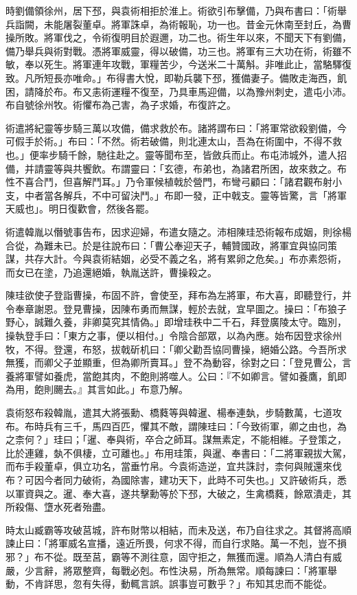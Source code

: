 \begin{pinyinscope}
時劉備領徐州，居下邳，與袁術相拒於淮上。術欲引布擊備，乃與布書曰：「術舉兵詣闕，未能屠裂董卓。將軍誅卓，為術報恥，功一也。昔金元休南至封丘，為曹操所敗。將軍伐之，令術復明目於遐邇，功二也。術生年以來，不聞天下有劉備，備乃舉兵與術對戰。憑將軍威靈，得以破備，功三也。將軍有三大功在術，術雖不敏，奉以死生。將軍連年攻戰，軍糧苦少，今送米二十萬斛。非唯此止，當駱驛復致。凡所短長亦唯命。」布得書大悅，即勒兵襲下邳，獲備妻子。備敗走海西，飢困，請降於布。布又恚術運糧不復至，乃具車馬迎備，以為豫州刺史，遣屯小沛。布自號徐州牧。術懼布為己害，為子求婚，布復許之。

術遣將紀靈等步騎三萬以攻備，備求救於布。諸將謂布曰：「將軍常欲殺劉備，今可假手於術。」布曰：「不然。術若破備，則北連太山，吾為在術圍中，不得不救也。」便率步騎千餘，馳往赴之。靈等聞布至，皆斂兵而止。布屯沛城外，遣人招備，并請靈等與共饗飲。布謂靈曰：「玄德，布弟也，為諸君所困，故來救之。布性不喜合鬥，但喜解鬥耳。」乃令軍候植戟於營門，布彎弓顧曰：「諸君觀布射小支，中者當各解兵，不中可留決鬥。」布即一發，正中戟支。靈等皆驚，言「將軍天威也」。明日復歡會，然後各罷。

術遣韓胤以僭號事告布，因求迎婦，布遣女隨之。沛相陳珪恐術報布成姻，則徐楊合從，為難未已。於是往說布曰：「曹公奉迎天子，輔贊國政，將軍宜與協同策謀，共存大計。今與袁術結姻，必受不義之名，將有累卵之危矣。」布亦素怨術，而女已在塗，乃追還絕婚，執胤送許，曹操殺之。

陳珪欲使子登詣曹操，布固不許，會使至，拜布為左將軍，布大喜，即聽登行，并令奉章謝恩。登見曹操，因陳布勇而無謀，輕於去就，宜早圖之。操曰：「布狼子野心，誠難久養，非卿莫究其情偽。」即增珪秩中二千石，拜登廣陵太守。臨別，操執登手曰：「東方之事，便以相付。」令陰合部眾，以為內應。始布因登求徐州牧，不得。登還，布怒，拔戟斫机曰：「卿父勸吾協同曹操，絕婚公路。今吾所求無獲，而卿父子並顯重，但為卿所賣耳。」登不為動容，徐對之曰：「登見曹公，言養將軍譬如養虎，當飽其肉，不飽則將噬人。公曰：『不如卿言。譬如養鷹，飢即為用，飽則颺去。』其言如此。」布意乃解。

袁術怒布殺韓胤，遣其大將張勳、橋蕤等與韓暹、楊奉連埶，步騎數萬，七道攻布。布時兵有三千，馬四百匹，懼其不敵，謂陳珪曰：「今致術軍，卿之由也，為之柰何？」珪曰；「暹、奉與術，卒合之師耳。謀無素定，不能相維。子登策之，比於連雞，埶不俱棲，立可離也。」布用珪策，與暹、奉書曰：「二將軍親拔大駕，而布手殺董卓，俱立功名，當垂竹帛。今袁術造逆，宜共誅討，柰何與賊還來伐布？可因今者同力破術，為國除害，建功天下，此時不可失也。」又許破術兵，悉以軍資與之。暹、奉大喜，遂共擊勳等於下邳，大破之，生禽橋蕤，餘眾潰走，其所殺傷、墯水死者殆盡。

時太山臧霸等攻破莒城，許布財幣以相結，而未及送，布乃自往求之。其督將高順諫止曰：「將軍威名宣播，遠近所畏，何求不得，而自行求賂。萬一不剋，豈不損邪？」布不從。既至莒，霸等不測往意，固守拒之，無獲而還。順為人清白有威嚴，少言辭，將眾整齊，每戰必剋。布性決易，所為無常。順每諫曰：「將軍舉動，不肯詳思，忽有失得，動輒言誤。誤事豈可數乎？」布知其忠而不能從。


\end{pinyinscope}
